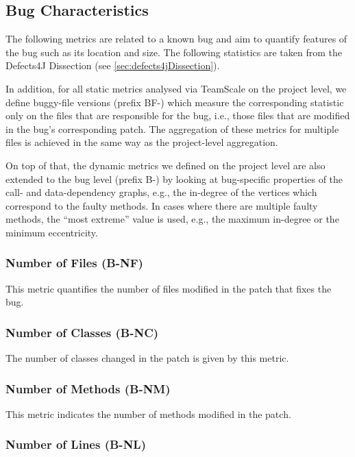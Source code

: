 \subsection{Bug Characteristics}

The following metrics are related to a known bug and aim to quantify features of
the bug such as its location and size. The following  statistics are taken from
the Defects4J Dissection (see \ref{sec:defects4jDissection}).

In addition, for all static metrics analysed via TeamScale on the project level,
we define buggy-file versions (prefix BF-) which measure the corresponding
statistic only on the files that are responsible for the bug, i.e., those files
that are modified in the bug's corresponding patch. The aggregation of these
metrics for multiple files is achieved in the same way as the project-level
aggregation.

On top of that, the dynamic metrics we defined on the project level are also
extended to the bug level (prefix B-) by looking at bug-specific properties of
the call- and data-dependency graphs, e.g., the in-degree of the vertices which
correspond to the faulty methods. In cases where there are multiple faulty
methods, the \enquote{most extreme} value is used, e.g., the maximum in-degree
or the minimum eccentricity.

\subsubsection{Number of Files (B-NF)}

This metric quantifies the number of files modified in the patch that fixes the
bug.

\subsubsection{Number of Classes (B-NC)}

The number of classes changed in the patch is given by this metric.

\subsubsection{Number of Methods (B-NM)}

This metric indicates the number of methods modified in the patch.

\subsubsection{Number of Lines (B-NL)}

